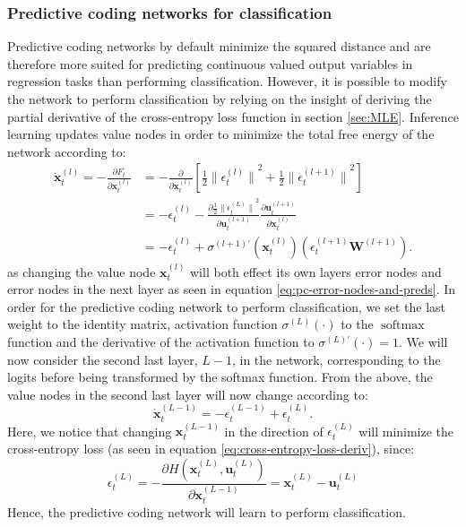 \documentclass[a4paper,11pt]{article} %
\DeclareMathOperator{\softmax}{softmax}
\begin{document}
\subsubsection{Predictive coding networks for classification}
Predictive coding networks by default minimize the squared distance and are therefore more suited for predicting continuous valued output variables in regression tasks than performing classification. However, it is possible to modify the network to perform classification by relying on the insight of deriving the partial derivative of the cross-entropy loss function in section \ref{sec:MLE}. Inference learning updates value nodes in order to minimize the total free energy of the network according to:
\begin{equation} \label{eq:value-node-derivative}
  \begin{split}
  \dot{\mathbf{x}}_t^{(l)} = -\frac{\partial F_t}{\partial \mathbf{x}_t^{(l)}} & = - \frac{\partial }{\partial \mathbf{x}_t^{(l)}} \left[ \frac{1}{2} {\lVert \epsilon_t^{(l)} \rVert}^2 + \frac{1}{2} {\lVert \epsilon_t^{(l+1)} \rVert}^2  \right] \\
  & = -\epsilon_t^{(l)} - \frac{\partial \frac{1}{2} {\lVert \epsilon_t^{(L)} \rVert}^2}{\partial \mathbf{u}_t^{(l+1)}} \frac{\partial \mathbf{u}_t^{(l+1)}}{\partial \mathbf{x}_t^{(l)}} \\
  & = -\epsilon_{t}^{(l)}+\sigma^{(l+1)\prime}(\mathbf{x}_{t}^{(l)})(\epsilon_{t}^{(l+1)} \mathbf{W}^{(l+1)}).
  \end{split}
\end{equation}
as changing the value node $\mathbf{x}_t^{(l)}$ will both effect its own layers error nodes and error nodes in the next layer as seen in equation \ref{eq:pc-error-nodes-and-preds}. In order for the predictive coding network to perform classification, we set the last weight to the identity matrix, activation function $\sigma^{(L)}(\cdot)$ to the $\softmax$ function and the derivative of the activation function to $\sigma^{(L)\prime}(\cdot) = 1$. We will now consider the second last layer, $L-1$, in the network, corresponding to the logits before being transformed by the softmax function. From the above, the value nodes in the second last layer will now change according to:
\begin{equation}
  \dot{\mathbf{x}}_{t}^{(L-1)} = -\epsilon_{t}^{(L-1)} + \epsilon_{t}^{(L)}.
\end{equation}
Here, we notice that changing $\mathbf{x}_t^{(L-1)}$ in the direction of $\epsilon_{t}^{(L)}$ will minimize the cross-entropy loss (as seen in equation \ref{eq:cross-entropy-loss-deriv}), since:
\begin{equation}
  \epsilon_{t}^{(L)} = -\frac{\partial H(\mathbf{x}_t^{(L)}, \mathbf{u}_t^{(L)})}{\partial \mathbf{x}_t^{(L-1)}} = \mathbf{x}_t^{(L)} - \mathbf{u}_t^{(L)}
\end{equation}
Hence, the predictive coding network will learn to perform classification. 
\end{document}
